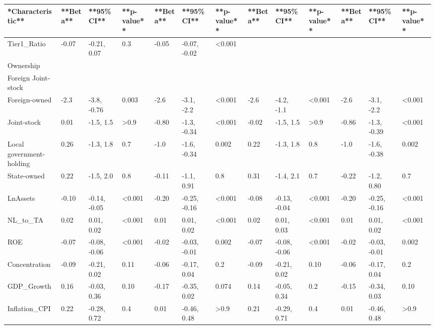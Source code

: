 \documentclass{article}
\begin{document}
\begin{tabu} to 
\hline
**Characteristic** & **Beta** & **95\% CI** & **p-value** & **Beta** & **95\% CI** & **p-value** & **Beta** & **95\% CI** & **p-value** & **Beta** & **95\% CI** & **p-value**\\
\hline
Tier1\_Ratio & -0.07 & -0.21, 0.07 & 0.3 & -0.05 & -0.07, -0.02 & <0.001 &  &  &  &  &  & \\
\hline
Ownership &  &  &  &  &  &  &  &  &  &  &  & \\
\hline
Foreign Joint-stock &  &  &  &  &  &  &  &  &  &  &  & \\
\hline
Foreign-owned & -2.3 & -3.8, -0.76 & 0.003 & -2.6 & -3.1, -2.2 & <0.001 & -2.6 & -4.2, -1.1 & <0.001 & -2.6 & -3.1, -2.2 & <0.001\\
\hline
Joint-stock & 0.01 & -1.5, 1.5 & >0.9 & -0.80 & -1.3, -0.34 & <0.001 & -0.02 & -1.5, 1.5 & >0.9 & -0.86 & -1.3, -0.39 & <0.001\\
\hline
Local government-holding & 0.26 & -1.3, 1.8 & 0.7 & -1.0 & -1.6, -0.34 & 0.002 & 0.22 & -1.3, 1.8 & 0.8 & -1.0 & -1.6, -0.38 & 0.002\\
\hline
State-owned & 0.22 & -1.5, 2.0 & 0.8 & -0.11 & -1.1, 0.91 & 0.8 & 0.31 & -1.4, 2.1 & 0.7 & -0.22 & -1.2, 0.80 & 0.7\\
\hline
LnAssets & -0.10 & -0.14, -0.05 & <0.001 & -0.20 & -0.25, -0.16 & <0.001 & -0.08 & -0.13, -0.04 & <0.001 & -0.20 & -0.25, -0.16 & <0.001\\
\hline
NL\_to\_TA & 0.02 & 0.01, 0.02 & <0.001 & 0.01 & 0.01, 0.02 & <0.001 & 0.02 & 0.01, 0.03 & <0.001 & 0.01 & 0.01, 0.02 & <0.001\\
\hline
ROE & -0.07 & -0.08, -0.06 & <0.001 & -0.02 & -0.03, -0.01 & 0.002 & -0.07 & -0.08, -0.06 & <0.001 & -0.02 & -0.03, -0.01 & 0.002\\
\hline
Concentration & -0.09 & -0.21, 0.02 & 0.11 & -0.06 & -0.17, 0.04 & 0.2 & -0.09 & -0.21, 0.02 & 0.10 & -0.06 & -0.17, 0.04 & 0.2\\
\hline
GDP\_Growth & 0.16 & -0.03, 0.36 & 0.10 & -0.17 & -0.35, 0.02 & 0.074 & 0.14 & -0.05, 0.34 & 0.2 & -0.15 & -0.34, 0.03 & 0.10\\
\hline
Inflation\_CPI & 0.22 & -0.28, 0.72 & 0.4 & 0.01 & -0.46, 0.48 & >0.9 & 0.21 & -0.29, 0.71 & 0.4 & 0.01 & -0.46, 0.48 & >0.9\\

\end{tabu}
\end{document}
